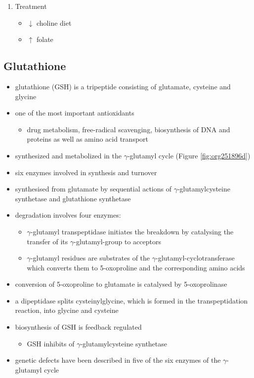 \documentclass[12pt]{scrartcl}
\begin{document}
\begin{enumerate}
\item Treatment
\label{sec:org09edd32}
\begin{itemize}
\item \(\downarrow\) choline diet
\item \(\uparrow\) folate
\end{itemize}
\end{enumerate}

\subsection{Glutathione}
\label{sec:orgaba7588}
\begin{itemize}
\item glutathione (GSH) is a tripeptide consisting of glutamate, cysteine and glycine
\item one of the most important antioxidants
\begin{itemize}
\item drug metabolism, free-radical scavenging, biosynthesis of DNA and
proteins as well as amino acid transport
\end{itemize}
\item synthesized and metabolized in the \(\gamma\)-glutamyl cycle (Figure
\ref{fig:org251896d})
\item six enzymes involved in synthesis and turnover
\item synthesised from glutamate by sequential actions of
\(\gamma\)-glutamylcysteine synthetase and glutathione
synthetase
\item degradation involves four enzymes:
\begin{itemize}
\item \(\gamma\)-glutamyl transpeptidase initiates the breakdown by
catalysing the transfer of its \(\gamma\)-glutamyl-group to
acceptors
\item \(\gamma\)-glutamyl residues are substrates of the
\(\gamma\)-glutamyl-cyclotransferase which converts them to
5-oxoproline and the corresponding amino acids
\end{itemize}
\item conversion of 5-oxoproline to glutamate is catalysed by
5-oxoprolinase
\item a dipeptidase splits cysteinylglycine, which is formed in the
transpeptidation reaction, into glycine and cysteine
\item biosynthesis of GSH is feedback regulated
\begin{itemize}
\item GSH inhibits of \(\gamma\)-glutamylcysteine synthetase
\end{itemize}
\item genetic defects have been described in five of the six enzymes of
the \(\gamma\)-glutamyl cycle
\end{itemize}
\end{document}
